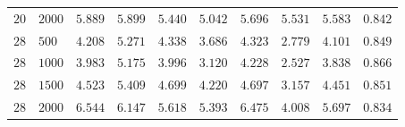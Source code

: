 \begin{table}[t]
{\begin{tabular}{ll|ccccccc|c}
    $20$ & $2000$ & $5.889$ & $5.899$ & $5.440$ & $5.042$ & $5.696$ & $5.531$ & $5.583$ & $0.842$\\
    $28$ & $500$  & $4.208$ & $5.271$ & $4.338$ & $3.686$ & $4.323$ & $2.779$ & $4.101$ & $0.849$\\
    $28$ & $1000$ & $3.983$ & $5.175$ & $3.996$ & $3.120$ & $4.228$ & $2.527$ & $3.838$ & $0.866$\\
    $28$ & $1500$ & $4.523$ & $5.409$ & $4.699$ & $4.220$ & $4.697$ & $3.157$ & $4.451$ & $0.851$\\
    $28$ & $2000$ & $6.544$ & $6.147$ & $5.618$ & $5.393$ & $6.475$ & $4.008$ & $5.697$ & $0.834$\\
    \bottomrule
  \end{tabular}%
  }
\end{table}